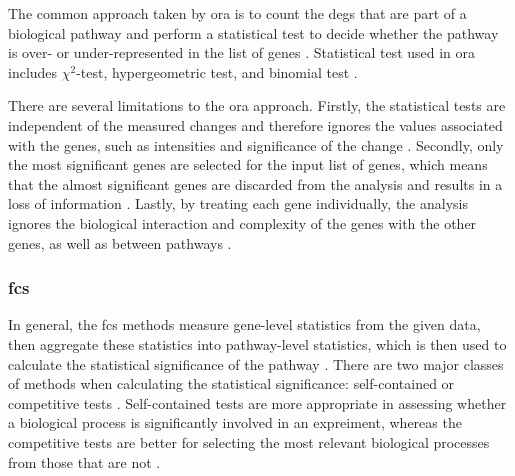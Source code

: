The common approach taken by \gls{ora} is to count the \glspl{deg} that are part of a biological pathway and perform a statistical test to decide whether the pathway is over- or under-represented in the list of genes \citep{Khatri2012}.
Statistical test used in \gls{ora} includes $\chi^2$-test, hypergeometric test, and binomial test \citep{Khatri2012}.

There are several limitations to the \gls{ora} approach.
Firstly, the statistical tests are independent of the measured changes and therefore ignores the values associated with the genes, such as intensities and significance of the change \citep{Khatri2012}.
Secondly, only the most significant genes are selected for the input list of genes, which means that the almost significant genes are discarded from the analysis and results in a loss of information \citep{Khatri2012}.
Lastly, by treating each gene individually, the analysis ignores the biological interaction and complexity of the genes with the other genes, as well as between pathways \citep{Khatri2012}.

\subsubsection{\gls{fcs}}
\label{ssub:fcs}

In general, the \gls{fcs} methods measure gene-level statistics from the given data, then aggregate these statistics into pathway-level statistics, which is then used to calculate the statistical significance of the pathway \citep{Khatri2012}.
There are two major classes of methods when calculating the statistical significance: self-contained or competitive tests \citep{Goeman2007}.
Self-contained tests are more appropriate in assessing whether a biological process is significantly involved in an expreiment, whereas the competitive tests are better for selecting the most relevant biological processes from those that are not \citep{Wu2012}.

